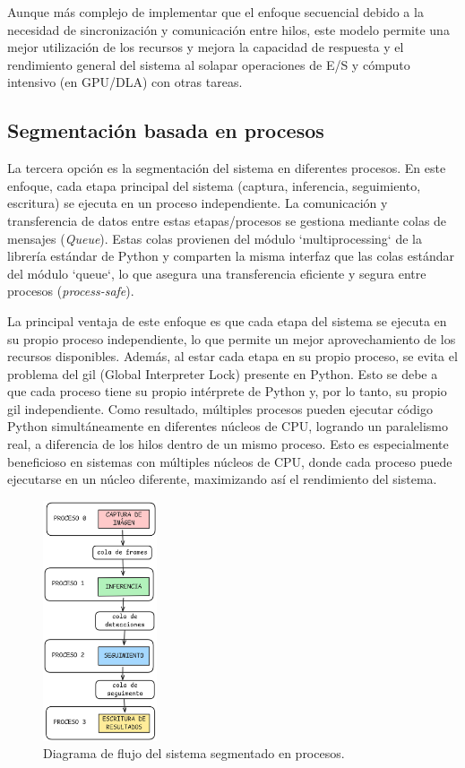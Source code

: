 \documentclass[11pt,spanish,listoffigures,listoftables]{tfgetsinf}
\begin{document}
Aunque más complejo de implementar que el enfoque secuencial debido a la necesidad de sincronización y comunicación entre hilos, este modelo permite una mejor utilización de los recursos y mejora la capacidad de respuesta y el rendimiento general del sistema al solapar operaciones de E/S y cómputo intensivo (en GPU/DLA) con otras tareas.

\subsection{Segmentación basada en procesos} \label{sub:segmentacion_procesos}

La tercera opción es la segmentación del sistema en diferentes procesos. En este enfoque, cada etapa principal del sistema (captura, inferencia, seguimiento, escritura) se ejecuta en un proceso independiente. La comunicación y transferencia de datos entre estas etapas/procesos se gestiona mediante colas de mensajes (\textit{Queue}). Estas colas provienen del módulo `multiprocessing` de la librería estándar de Python y comparten la misma interfaz que las colas estándar del módulo `queue`, lo que asegura una transferencia eficiente y segura entre procesos (\textit{process-safe}).

La principal ventaja de este enfoque es que cada etapa del sistema se ejecuta en su propio proceso independiente, lo que permite un mejor aprovechamiento de los recursos disponibles. Además, al estar cada etapa en su propio proceso, se evita el problema del \gls{gil} (Global Interpreter Lock) presente en Python. Esto se debe a que cada proceso tiene su propio intérprete de Python y, por lo tanto, su propio \gls{gil} independiente. Como resultado, múltiples procesos pueden ejecutar código Python simultáneamente en diferentes núcleos de CPU, logrando un paralelismo real, a diferencia de los hilos dentro de un mismo proceso. Esto es especialmente beneficioso en sistemas con múltiples núcleos de CPU, donde cada proceso puede ejecutarse en un núcleo diferente, maximizando así el rendimiento del sistema.

\begin{figure}[H]
   \centering
   \includegraphics[width=0.3\textwidth]{images/diseno_e_implementacion/segmentacion_procesos.png}
   \caption[Diagrama de flujo del sistema segmentado en procesos]{Diagrama de flujo del sistema segmentado en procesos.}
   \label{fig:procesos}
\end{figure}
\end{document}
